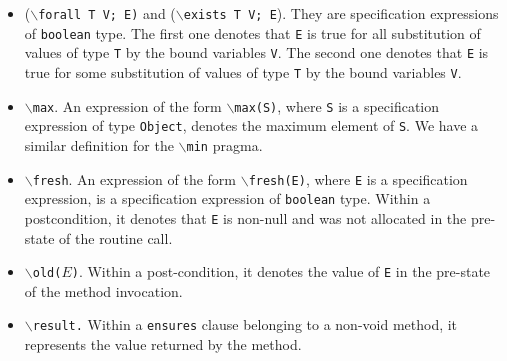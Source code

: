\documentclass[a4paper]{llncs}
\begin{document}
\begin{itemize}
\item {($\backslash$\texttt{forall T V; E)} and
($\backslash$\texttt{exists T V; E}).}
They are specification expressions of \texttt{boolean} type. The first one
denotes that \texttt{E} is true for all substitution of values
of type \texttt{T} by the bound variables \texttt{V}. The second one
denotes that \texttt{E} is true for some substitution of values of
type \texttt{T} by the bound variables \texttt{V}.

\item {$\backslash$\texttt{max}.} An expression of the form
\texttt{$\backslash$max(S)}, where \texttt{S} is a specification
expression of type \texttt{Object}, denotes the maximum element of
\texttt{S}. We have a similar definition for the
$\backslash$\texttt{min} pragma.

\item{\texttt{$\backslash$fresh}.} An expression of the form
\texttt{$\backslash$fresh(E)}, where \texttt{E} is a specification
expression, is a specification expression of \texttt{boolean}
type. Within a postcondition, it denotes that \texttt{E}
is non-null and was not allocated in the pre-state of the routine
call.

\item{\texttt{$\backslash$old($E$)}.} Within a post-condition, it denotes
the value of \texttt{E} in the pre-state of the method invocation. %


\item {\tt$\backslash$result.} Within a \texttt{ensures} clause
belonging to a non-void method, it represents the value returned by
the method. %



\end{itemize}
\end{document}
